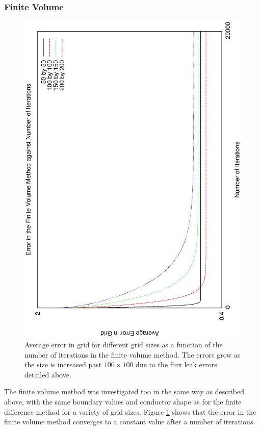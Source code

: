 \documentclass[aps,twocolumn,pre,nofootinbib,10pt]{revtex4-1}
\begin{document}
\subsubsection{Finite Volume}

\begin{figure}
\includegraphics[height=\breite \columnwidth,angle=-90]{fv_it.eps}
\caption{Average error in grid for different grid sizes as a function of the number of iterations in the finite volume method. The errors grow as the size is increased past $100 \times 100$ due to the flux leak errors detailed above.}
\label{fig:fv}
\end{figure}

The finite volume method was investigated too in the same way as described above, with the same boundary values and conductor shape as for the finite difference method for a variety of grid sizes. Figure \ref{fig:fv} shows that the error in the finite volume method converges to a constant value after a number of iterations.
\end{document}
